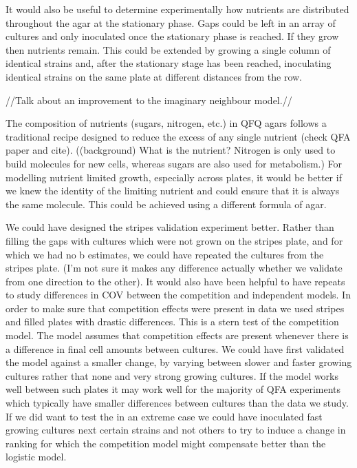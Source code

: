 It would also be useful to determine experimentally how nutrients are
distributed throughout the agar at the stationary phase. Gaps could be
left in an array of cultures and only inoculated once the stationary
phase is reached. If they grow then nutrients remain. This could be
extended by growing a single column of identical strains and, after
the stationary stage has been reached, inoculating identical strains
on the same plate at different distances from the row.

//Talk about an improvement to the imaginary neighbour model.//

The composition of nutrients (sugars, nitrogen, etc.) in QFQ agars
follows a traditional recipe designed to reduce the excess of any
single nutrient (check QFA paper and cite). ((background) What is the
nutrient?  Nitrogen is only used to build molecules for new cells,
whereas sugars are also used for metabolism.) For modelling nutrient
limited growth, especially across plates, it would be better if we
knew the identity of the limiting nutrient and could ensure that it is
always the same molecule. This could be achieved using a different
formula of agar.

We could have designed the stripes validation experiment
better. Rather than filling the gaps with cultures which were not
grown on the stripes plate, and for which we had no b estimates, we
could have repeated the cultures from the stripes plate. (I'm not sure
it makes any difference actually whether we validate from one
direction to the other). It would also have been helpful to have
repeats to study differences in COV between the competition and
independent models. In order to make sure that competition effects
were present in data we used stripes and filled plates with drastic
differences. This is a stern test of the competition model. The model
assumes that competition effects are present whenever there is a
difference in final cell amounts between cultures. We could have first
validated the model against a smaller change, by varying between
slower and faster growing cultures rather that none and very strong
growing cultures. If the model works well between such plates it may
work well for the majority of QFA experiments which typically have
smaller differences between cultures than the data we study. If we did
want to test the in an extreme case we could have inoculated fast
growing cultures next certain strains and not others to try to induce
a change in ranking for which the competition model might compensate
better than the logistic model.

